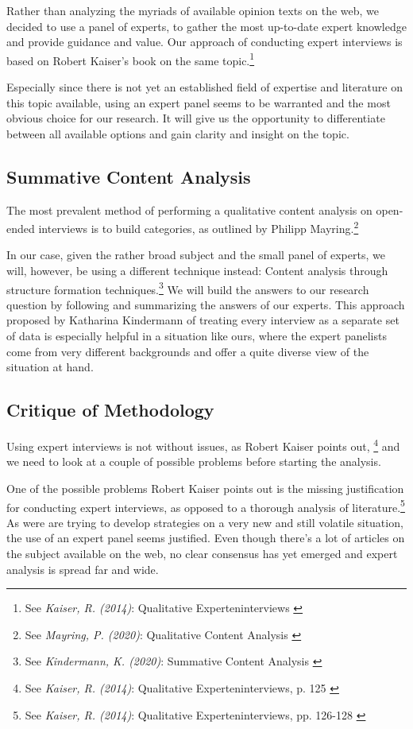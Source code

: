 Rather than analyzing the myriads of available opinion texts on the web, we decided to use a panel of experts, to gather the most up-to-date expert knowledge and provide guidance and value. Our approach of conducting expert interviews is based on Robert Kaiser's book on the same topic.\footnote{See \textit{Kaiser, R. (2014)}: Qualitative Experteninterviews \cite{expertInterviews}}

Especially since there is not yet an established field of expertise and literature on this topic available, using an expert panel seems to be warranted and the most obvious choice for our research. It will give us the opportunity to differentiate between all available options and gain clarity and insight on the topic.

\subsection{Summative Content Analysis} 

The most prevalent method of performing a qualitative content analysis on open-ended interviews is to build categories, as outlined by Philipp Mayring.\footnote{See \textit{Mayring, P. (2020)}: Qualitative Content Analysis \cite{qualiContent}}

In our case, given the rather broad subject and the small panel of experts, we will, however, be using a different technique instead: Content analysis through structure formation techniques.\footnote{See \textit{Kindermann, K. (2020)}: Summative Content Analysis \cite{summaContent}} We will build the answers to our research question by following and summarizing the answers of our experts. This approach proposed by Katharina Kindermann of treating every interview as a separate set of data is especially helpful in a situation like ours, where the expert panelists come from very different backgrounds and offer a quite diverse view of the situation at hand.

\subsection{Critique of Methodology}

Using expert interviews is not without issues, as Robert Kaiser points out, \footnote{See \textit{Kaiser, R. (2014)}: Qualitative Experteninterviews, p. 125 \cite{expertInterviews}} and we need to look at a couple of possible problems before starting the analysis.

One of the possible problems Robert Kaiser points out is the missing justification for conducting expert interviews, as opposed to a thorough analysis of literature.\footnote{See \textit{Kaiser, R. (2014)}: Qualitative Experteninterviews, pp. 126-128 \cite{expertInterviews}} As were are trying to develop strategies on a very new and still volatile situation, the use of an expert panel seems justified. Even though there's a lot of articles on the subject available on the web, no clear consensus has yet emerged and expert analysis is spread far and wide.

